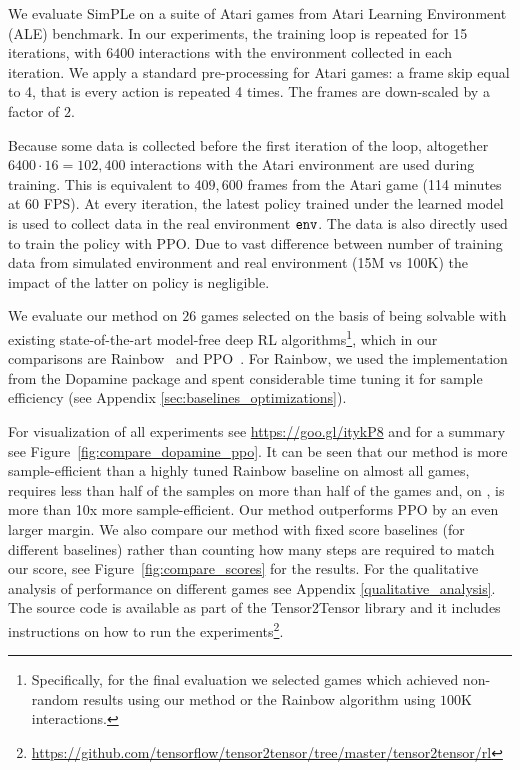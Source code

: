 We evaluate SimPLe on a suite of Atari games from Atari Learning Environment (ALE) benchmark.
In our experiments, the training loop is repeated for 15 iterations, with $6400$ interactions with the environment collected in each iteration.
We apply a standard pre-processing for Atari games: a frame skip equal to 4, that is every action
is repeated 4 times. The frames are down-scaled by a factor of $2$.

Because some data is collected before the first iteration of the loop,
altogether $6400 \cdot 16 = 102,400$ interactions with the Atari environment are used during training.
This is equivalent to $409,600$ frames from the Atari game (114 minutes at 60 FPS).
At every iteration, the latest policy trained under the learned model is used to collect data in the real environment ${\texttt{env}}$.
The data is also directly used to train the policy with PPO.
Due to vast difference between number of training data from simulated environment and real environment (15M vs 100K) the impact of the latter on policy is negligible.

We evaluate our method on $26$ games selected on the basis of being solvable with existing state-of-the-art model-free deep RL algorithms\footnote{Specifically, for the final evaluation we selected games which achieved non-random results using our method or the Rainbow algorithm using $100$K interactions.}, which in our comparisons are Rainbow~\cite{rainbow} and PPO~\cite{ppo}. For Rainbow, we used the implementation from the Dopamine package and spent considerable time tuning it for sample efficiency (see Appendix \ref{sec:baselines_optimizations}).

For visualization of all experiments see \url{https://goo.gl/itykP8}
and for a summary see Figure~\ref{fig:compare_dopamine_ppo}.
It can be seen that our method is more sample-efficient than a highly tuned Rainbow baseline on almost all games, requires less than half of the samples on more than half of the games and, on {\freeway}, is more than 10x more sample-efficient. Our method outperforms PPO by an even larger margin.
We also compare our method with fixed score baselines (for different baselines) rather than counting how many steps are required to match our score, see Figure~\ref{fig:compare_scores} for the results.
For the qualitative analysis of performance on different games see Appendix \ref{qualitative_analysis}.
The source code is available as part of the Tensor2Tensor library and it includes instructions on how to run the experiments\footnote{\url{https://github.com/tensorflow/tensor2tensor/tree/master/tensor2tensor/rl}}.

